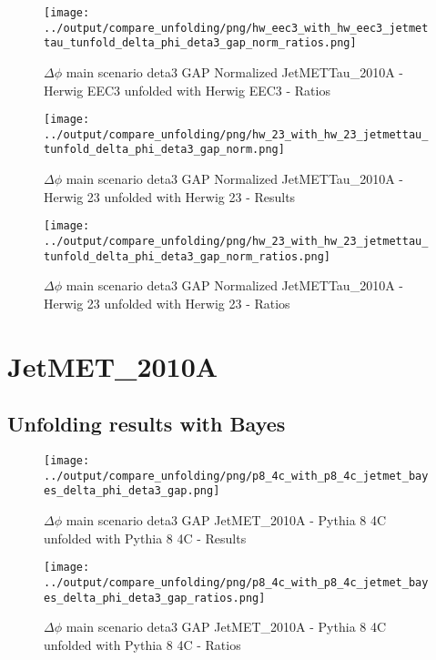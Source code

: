 \documentclass[11pt]{book}
\begin{document}
\begin{figure}[ht]
\centering
\texttt{[image: ../output/compare\_unfolding/png/hw\_eec3\_with\_hw\_eec3\_jetmettau\_tunfold\_delta\_phi\_deta3\_gap\_norm\_ratios.png]}
\caption{$\Delta\phi$ main scenario deta3 GAP Normalized JetMETTau\_2010A - Herwig EEC3 unfolded with Herwig EEC3 - Ratios}
\label{hw_eec3_hw_eec3_jetmettau_tunfold_delta_phi_deta3_gap_norm_b}
\end{figure}

\begin{figure}[ht]
\centering
\texttt{[image: ../output/compare\_unfolding/png/hw\_23\_with\_hw\_23\_jetmettau\_tunfold\_delta\_phi\_deta3\_gap\_norm.png]}
\caption{$\Delta\phi$ main scenario deta3 GAP Normalized JetMETTau\_2010A - Herwig 23 unfolded with Herwig 23 - Results}
\label{hw_23_hw_23_jetmettau_tunfold_delta_phi_deta3_gap_norm_a}
\end{figure}

\begin{figure}[ht]
\centering
\texttt{[image: ../output/compare\_unfolding/png/hw\_23\_with\_hw\_23\_jetmettau\_tunfold\_delta\_phi\_deta3\_gap\_norm\_ratios.png]}
\caption{$\Delta\phi$ main scenario deta3 GAP Normalized JetMETTau\_2010A - Herwig 23 unfolded with Herwig 23 - Ratios}
\label{hw_23_hw_23_jetmettau_tunfold_delta_phi_deta3_gap_norm_b}
\end{figure}


\clearpage
\section{JetMET\_2010A}
\subsection{Unfolding results with Bayes}

\begin{figure}[ht]
\centering
\texttt{[image: ../output/compare\_unfolding/png/p8\_4c\_with\_p8\_4c\_jetmet\_bayes\_delta\_phi\_deta3\_gap.png]}
\caption{$\Delta\phi$ main scenario deta3 GAP JetMET\_2010A - Pythia 8 4C unfolded with Pythia 8 4C - Results}
\label{p8_p8_jetmet_bayes_delta_phi_deta3_gap_a}
\end{figure}

\begin{figure}[ht]
\centering
\texttt{[image: ../output/compare\_unfolding/png/p8\_4c\_with\_p8\_4c\_jetmet\_bayes\_delta\_phi\_deta3\_gap\_ratios.png]}
\caption{$\Delta\phi$ main scenario deta3 GAP JetMET\_2010A - Pythia 8 4C unfolded with Pythia 8 4C - Ratios}
\label{p8_p8_jetmet_bayes_delta_phi_deta3_gap_b}
\end{figure}
\end{document}
